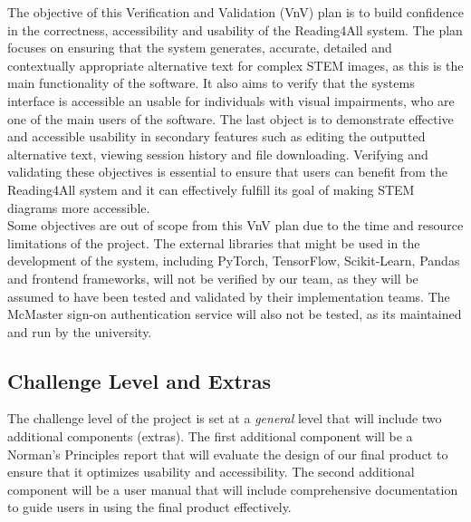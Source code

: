 \documentclass[12pt, titlepage]{article}
\begin{document}
The objective of this Verification and Validation (VnV) plan is to build confidence in the correctness, accessibility and usability of the Reading4All system. 
The plan focuses on ensuring that the system generates, accurate, detailed and contextually appropriate alternative text for complex STEM images, as this is the main functionality of the software. 
It also aims to verify that the systems interface is accessible an usable for individuals with visual impairments, who are one of the main users of the software. The last object is to demonstrate effective and accessible usability in secondary features
such as editing the outputted alternative text, viewing session history and file downloading. 
Verifying and validating these objectives is essential to ensure that users can benefit from the Reading4All system and 
it can effectively fulfill its goal of making STEM diagrams more accessible.
\\

Some objectives are out of scope from this VnV plan due to the time
and resource limitations of the project.
The external libraries that might be used in the development of the
system, including PyTorch, TensorFlow, Scikit-Learn, Pandas and
frontend frameworks, will not be verified by our team, as they will
be assumed to have been tested and validated by their implementation teams.
The McMaster sign-on authentication service will also not be tested,
as its maintained and run by the university.

\subsection{Challenge Level and Extras}

The challenge level of the project is set at a \textit{general} level
that will include two additional
components (extras). The first additional component will be a
Norman's Principles report that will
evaluate the design of our final product to ensure that it optimizes
usability and accessibility. The second additional
component will be a user manual that will include comprehensive
documentation to guide users in using the final
product effectively.
\end{document}
